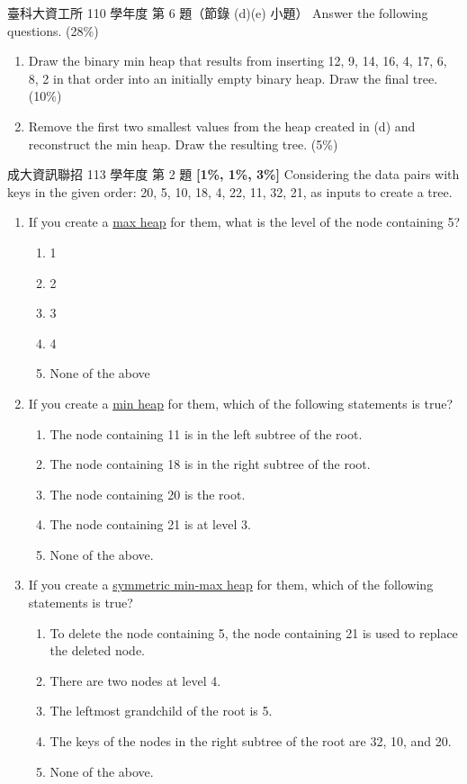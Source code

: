\begin{pastexam}[label={px:hp-2}]{臺科大資工所 110 學年度 第 6 題（節錄 (d)(e) 小題）}
Answer the following questions. (28\%)
\begin{enumerate}[label=(\alph*), start=4]
\item Draw the binary min heap that results from inserting 12, 9, 14, 16, 4, 17, 6, 8, 2 in that order into an initially empty binary heap. Draw the final tree. (10\%)
\item Remove the first two smallest values from the heap created in (d) and reconstruct the min heap. Draw the resulting tree. (5\%)
\end{enumerate}
\end{pastexam}

\begin{pastexam}[label={px:hp-3}]{成大資訊聯招 113 學年度 第 2 題}
\textbf{[1\%, 1\%, 3\%]} Considering the data pairs with keys in the given order: 20, 5, 10, 18, 4, 22, 11, 32, 21, as inputs to create a tree.
\begin{enumerate}[label=\roman*)]
\item If you create a \underline{max heap} for them, what is the level of the node containing 5?
\begin{enumerate}[label=(\Alph*)]
\item 1
\item 2
\item 3
\item 4
\item None of the above
\end{enumerate}
\item If you create a \underline{min heap} for them, which of the following statements is true?
\begin{enumerate}[label=(\Alph*)]
\item The node containing 11 is in the left subtree of the root.
\item The node containing 18 is in the right subtree of the root.
\item The node containing 20 is the root.
\item The node containing 21 is at level 3.
\item None of the above.
\end{enumerate}
\item If you create a \underline{symmetric min-max heap} for them, which of the following statements is true?
\begin{enumerate}[label=(\Alph*)]
\item To delete the node containing 5, the node containing 21 is used to replace the deleted node.
\item There are two nodes at level 4.
\item The leftmost grandchild of the root is 5.
\item The keys of the nodes in the right subtree of the root are 32, 10, and 20.
\item None of the above.
\end{enumerate}
\end{enumerate}
\end{pastexam}


